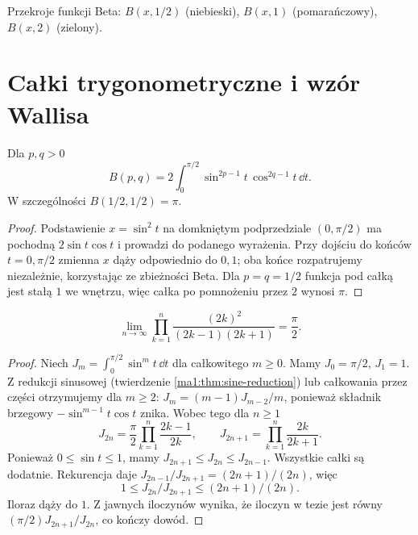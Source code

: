 \begin{center}
\begin{tikzpicture}[x=2cm,y=0.9cm,>=Stealth]
\end{tikzpicture}

\small Przekroje funkcji Beta: $B(x,1/2)$ (niebieski), $B(x,1)$ (pomarańczowy), $B(x,2)$ (zielony).
\end{center}

\section{Całki trygonometryczne i wzór Wallisa}
\begin{twierdzenie}
\label{ma1:thm:beta-trigonometric}
Dla $p,q>0$
\[
 B(p,q)=2\int_0^{\pi/2}\sin^{2p-1}t\,\cos^{2q-1}t\,\dd t.
\]
W szczególności $B(1/2,1/2)=\pi$.
\end{twierdzenie}
\begin{proof}
Podstawienie $x=\sin^2 t$ na domkniętym podprzedziale $(0,\pi/2)$ ma pochodną $2\sin t\cos t$ i prowadzi do podanego wyrażenia. Przy dojściu do końców $t=0,\pi/2$ zmienna $x$ dąży odpowiednio do $0,1$; oba końce rozpatrujemy niezależnie, korzystając ze zbieżności Beta. Dla $p=q=1/2$ funkcja pod całką jest stałą $1$ we wnętrzu, więc całka po pomnożeniu przez $2$ wynosi $\pi$.
\end{proof}
\begin{twierdzenie}
\label{ma1:thm:wallis}
\[
 \lim_{n\to\infty}\prod_{k=1}^n
 \frac{(2k)^2}{(2k-1)(2k+1)}=\frac{\pi}{2}.
\]
\end{twierdzenie}
\begin{proof}
Niech $J_m=\int_0^{\pi/2}\sin^m t\,\dd t$ dla całkowitego $m\ge0$. Mamy $J_0=\pi/2$, $J_1=1$. Z redukcji sinusowej (twierdzenie \ref{ma1:thm:sine-reduction}) lub całkowania przez części otrzymujemy dla $m\ge2$:
$J_m=(m-1)J_{m-2}/m$, ponieważ składnik brzegowy $-\sin^{m-1}t\cos t$ znika. Wobec tego dla $n\ge1$
\[
 J_{2n}=\frac{\pi}{2}\prod_{k=1}^n\frac{2k-1}{2k},
 \qquad J_{2n+1}=\prod_{k=1}^n\frac{2k}{2k+1}.
\]
Ponieważ $0\le\sin t\le1$, mamy $J_{2n+1}\le J_{2n}\le J_{2n-1}$. Wszystkie całki są dodatnie. Rekurencja daje $J_{2n-1}/J_{2n+1}=(2n+1)/(2n)$, więc
\[
 1\le J_{2n}/J_{2n+1}\le(2n+1)/(2n).
\]
Iloraz dąży do $1$. Z jawnych iloczynów wynika, że iloczyn w tezie jest równy $(\pi/2)J_{2n+1}/J_{2n}$, co kończy dowód.
\end{proof}

